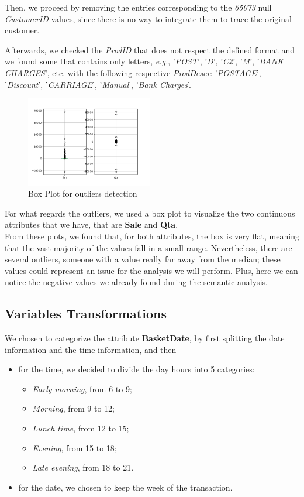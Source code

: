 Then, we proceed by removing the entries corresponding to the \emph{65073} null \emph{CustomerID} values, since there is no way to integrate them to trace the original customer.

Afterwards, we checked the \emph{ProdID} that does not respect the defined format and we found some that contains only letters, \emph{e.g.}, '\emph{POST}', '\emph{D}', '\emph{C2}', '\emph{M}', '\emph{BANK CHARGES}', etc. with the following respective \emph{ProdDescr}: '\emph{POSTAGE}', '\emph{Discount}', '\emph{CARRIAGE}', '\emph{Manual}', '\emph{Bank Charges}'.

\begin{figure}
\centering
\includegraphics[width=0.49\textwidth]{img/boxplot_before.png}
\caption{Box Plot for outliers detection}
\end{figure}

For what regards the outliers, we used a box plot to visualize the two continuous attributes that we have, that are \textbf{Sale} and \textbf{Qta}.\\
From these plots, we found that, for both attributes, the box is very flat, meaning that the vast majority of the values fall in a small range. Nevertheless, there are several outliers, someone with a value really far away from the median; these values could represent an issue for the analysis we will perform. Plus, here we can notice the negative values we already found during the semantic analysis.

\subsection{Variables Transformations}
We chosen to categorize the attribute \textbf{BasketDate}, by first splitting the date information and the time information, and then

\begin{itemize}
\item for the time, we decided to divide the day hours into 5 categories:
	\begin{itemize}
	\item \emph{Early morning}, from 6 to 9;
	\item \emph{Morning}, from 9 to 12;
	\item \emph{Lunch time}, from 12 to 15;
	\item \emph{Evening}, from 15 to 18;
	\item \emph{Late evening}, from 18 to 21.
	\end{itemize}
\item for the date, we chosen to keep the week of the transaction.
\end{itemize}

